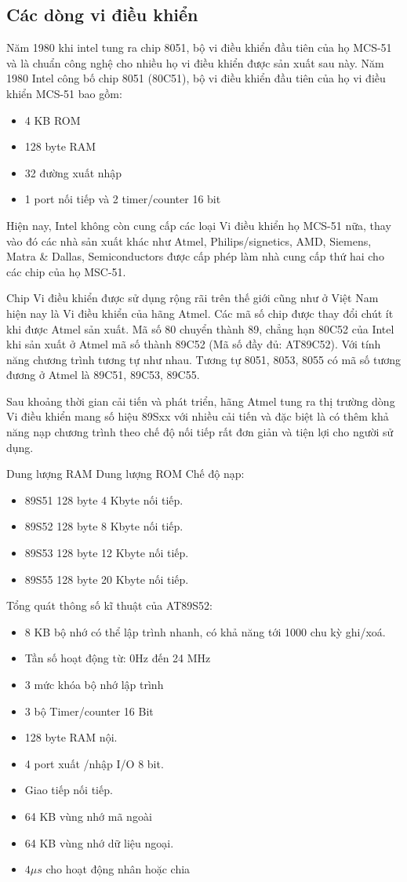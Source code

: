 \documentclass[../report.tex]{subfiles}
\begin{document}
\subsection{Các dòng vi điều khiển} 
Năm 1980 khi intel tung ra chip 8051, 
bộ vi điều khiển đầu tiên của họ MCS-51 và là chuẩn công nghệ cho 
nhiều họ vi điều khiển được sản xuất sau này.
Năm 1980 Intel công bố chip 8051 (80C51),
bộ vi điều khiển đầu tiên của họ vi điều khiển MCS-51 bao gồm:
\begin{itemize}
\item 4 KB ROM
\item 128 byte RAM
\item 32 đường xuất nhập 
\item 1 port nối tiếp và 2 timer/counter 16 bit
\end{itemize}
Hiện nay, Intel không còn cung cấp các loại 
Vi điều khiển họ MCS-51 nữa, thay vào đó các nhà sản xuất khác như Atmel, 
Philips/signetics, AMD, Siemens, Matra \& Dallas, Semiconductors 
được cấp phép làm nhà cung cấp thứ hai cho các chip của họ MSC-51.

Chip Vi điều khiển được sử dụng rộng rãi trên thế giới cũng như ở Việt Nam hiện nay là Vi điều khiển của hãng Atmel.
Các mã số chip được thay đổi chút ít khi được Atmel sản xuất. 
Mã số 80 chuyển thành 89, chẳng hạn 80C52 của Intel khi sản xuất ở Atmel mã số thành 89C52 (Mã số đầy đủ: AT89C52).
Với tính năng chương trình tương tự như nhau. Tương tự 8051, 8053, 8055 có mã số tương đương ở Atmel là 89C51, 89C53, 89C55.

Sau khoảng thời gian cải tiến và phát triển, 
hãng Atmel tung ra thị trường dòng Vi điều khiển mang số hiệu 89Sxx 
với nhiều cải tiến và đặc biệt là có thêm khả năng nạp chương trình 
theo chế độ nối tiếp rất đơn giản và tiện lợi cho người sử dụng.

Dung lượng RAM Dung lượng ROM Chế độ nạp:
\begin{itemize}
\item 89S51 128 byte 4 Kbyte nối tiếp.
\item 89S52 128 byte 8 Kbyte nối tiếp.
\item 89S53 128 byte 12 Kbyte nối tiếp.
\item 89S55 128 byte 20 Kbyte nối tiếp.
\end{itemize}

Tổng quát thông số kĩ thuật của AT89S52: 
\begin{itemize}
\item 8 KB bộ nhớ có thể lập trình nhanh, có khả năng tới 1000 chu kỳ ghi/xoá.
\item Tần số hoạt động từ: 0Hz đến 24 MHz
\item 3 mức khóa bộ nhớ lập trình
\item 3 bộ Timer/counter 16 Bit
\item 128 byte RAM nội.
\item 4 port xuất /nhập I/O 8 bit.
\item Giao tiếp nối tiếp.
\item 64 KB vùng nhớ mã ngoài
\item 64 KB vùng nhớ dữ liệu ngoại.
\item $4\mu s$ cho hoạt động nhân hoặc chia
\end{itemize}
\end{document}
